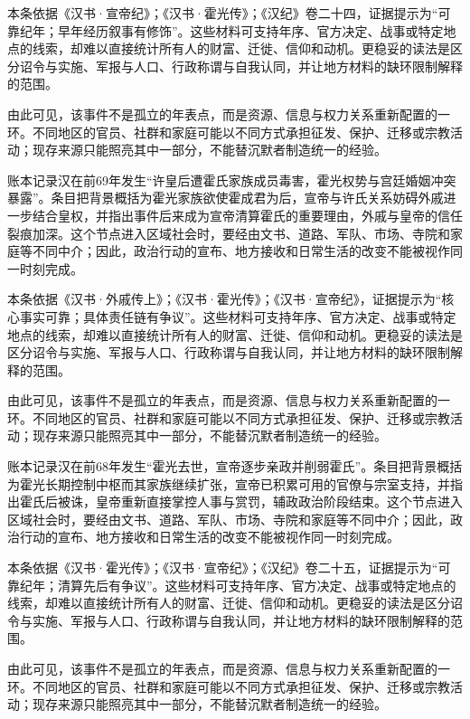 本条依据《汉书·宣帝纪》；《汉书·霍光传》；《汉纪》卷二十四，证据提示为“可靠纪年；早年经历叙事有修饰”。这些材料可支持年序、官方决定、战事或特定地点的线索，却难以直接统计所有人的财富、迁徙、信仰和动机。更稳妥的读法是区分诏令与实施、军报与人口、行政称谓与自我认同，并让地方材料的缺环限制解释的范围。

由此可见，该事件不是孤立的年表点，而是资源、信息与权力关系重新配置的一环。不同地区的官员、社群和家庭可能以不同方式承担征发、保护、迁移或宗教活动；现存来源只能照亮其中一部分，不能替沉默者制造统一的经验。

账本记录汉在前69年发生“许皇后遭霍氏家族成员毒害，霍光权势与宫廷婚姻冲突暴露”。条目把背景概括为霍光家族欲使霍成君为后，宣帝与许氏关系妨碍外戚进一步结合皇权，并指出事件后来成为宣帝清算霍氏的重要理由，外戚与皇帝的信任裂痕加深。这个节点进入区域社会时，要经由文书、道路、军队、市场、寺院和家庭等不同中介；因此，政治行动的宣布、地方接收和日常生活的改变不能被视作同一时刻完成。

本条依据《汉书·外戚传上》；《汉书·霍光传》；《汉书·宣帝纪》，证据提示为“核心事实可靠；具体责任链有争议”。这些材料可支持年序、官方决定、战事或特定地点的线索，却难以直接统计所有人的财富、迁徙、信仰和动机。更稳妥的读法是区分诏令与实施、军报与人口、行政称谓与自我认同，并让地方材料的缺环限制解释的范围。

由此可见，该事件不是孤立的年表点，而是资源、信息与权力关系重新配置的一环。不同地区的官员、社群和家庭可能以不同方式承担征发、保护、迁移或宗教活动；现存来源只能照亮其中一部分，不能替沉默者制造统一的经验。

账本记录汉在前68年发生“霍光去世，宣帝逐步亲政并削弱霍氏”。条目把背景概括为霍光长期控制中枢而其家族继续扩张，宣帝已积累可用的官僚与宗室支持，并指出霍氏后被诛，皇帝重新直接掌控人事与赏罚，辅政政治阶段结束。这个节点进入区域社会时，要经由文书、道路、军队、市场、寺院和家庭等不同中介；因此，政治行动的宣布、地方接收和日常生活的改变不能被视作同一时刻完成。

本条依据《汉书·霍光传》；《汉书·宣帝纪》；《汉纪》卷二十五，证据提示为“可靠纪年；清算先后有争议”。这些材料可支持年序、官方决定、战事或特定地点的线索，却难以直接统计所有人的财富、迁徙、信仰和动机。更稳妥的读法是区分诏令与实施、军报与人口、行政称谓与自我认同，并让地方材料的缺环限制解释的范围。

由此可见，该事件不是孤立的年表点，而是资源、信息与权力关系重新配置的一环。不同地区的官员、社群和家庭可能以不同方式承担征发、保护、迁移或宗教活动；现存来源只能照亮其中一部分，不能替沉默者制造统一的经验。

